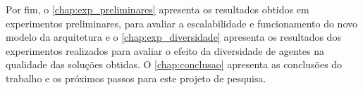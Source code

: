 Por fim, o \autoref{chap:exp_preliminares} apresenta os resultados obtidos em experimentos preliminares, para avaliar a escalabilidade e funcionamento do novo modelo da arquitetura e o \autoref{chap:exp_diversidade} apresenta os resultados dos experimentos realizados para avaliar o efeito da diversidade de agentes na qualidade das soluções obtidas. O \autoref{chap:conclusao} apresenta as conclusões do trabalho e os próximos passos para este projeto de pesquisa. 